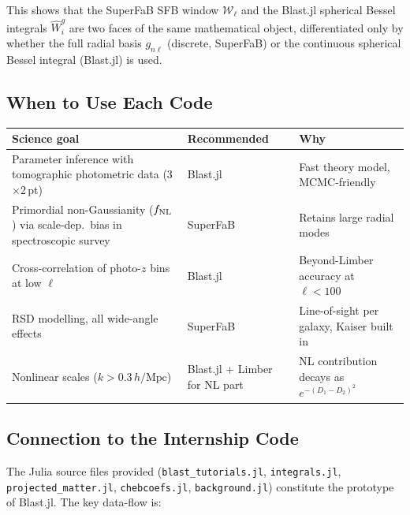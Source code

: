 This shows that the SuperFaB SFB window $\mathcal{W}_\ell$ and the
Blast.jl spherical Bessel integrals $\hat{W}_i^g$ are two faces of
the same mathematical object, differentiated only by whether the full
radial basis $g_{n\ell}$ (discrete, SuperFaB) or the continuous
spherical Bessel integral (Blast.jl) is used.

\subsection{When to Use Each Code}

\begin{center}
\renewcommand{\arraystretch}{1.4}
\begin{tabular}{p{5cm}p{4cm}p{4cm}}
\toprule
\textbf{Science goal} & \textbf{Recommended} & \textbf{Why} \\
\midrule
Parameter inference with tomographic
photometric data (3$\times$2\,pt) &
    Blast.jl & Fast theory model, MCMC-friendly \\
Primordial non-Gaussianity ($f_{\rm NL}$)
via scale-dep.\ bias in spectroscopic survey &
    SuperFaB & Retains large radial modes \\
Cross-correlation of photo-$z$ bins
at low $\ell$ &
    Blast.jl & Beyond-Limber accuracy at $\ell<100$ \\
RSD modelling, all wide-angle effects &
    SuperFaB & Line-of-sight per galaxy, Kaiser built in \\
Nonlinear scales ($k>0.3\,h/\mathrm{Mpc}$) &
    Blast.jl + Limber for NL part &
    NL contribution decays as $e^{-(D_1-D_2)^2}$ \\
\bottomrule
\end{tabular}
\end{center}

\subsection{Connection to the Internship Code}

The Julia source files provided (\texttt{blast\_tutorials.jl},
\texttt{integrals.jl}, \texttt{projected\_matter.jl},
\texttt{chebcoefs.jl}, \texttt{background.jl}) constitute the
prototype of Blast.jl. The key data-flow is:


